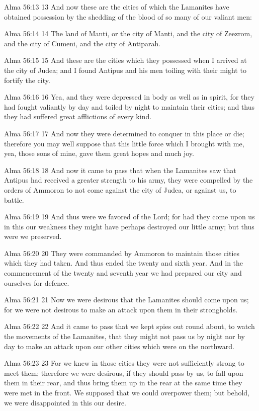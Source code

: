 Alma 56:13
 13 And now these are the cities of which the Lamanites have
obtained possession by the shedding of the blood of so many of
our valiant men:

Alma 56:14
 14 The land of Manti, or the city of Manti, and the city of
Zeezrom, and the city of Cumeni, and the city of Antiparah.

Alma 56:15
 15 And these are the cities which they possessed when I arrived
at the city of Judea; and I found Antipus and his men toiling
with their might to fortify the city.

Alma 56:16
 16 Yea, and they were depressed in body as well as in spirit,
for they had fought valiantly by day and toiled by night to
maintain their cities; and thus they had suffered great
afflictions of every kind.

Alma 56:17
 17 And now they were determined to conquer in this place or die;
therefore you may well suppose that this little force which I
brought with me, yea, those sons of mine, gave them great hopes
and much joy.

Alma 56:18
 18 And now it came to pass that when the Lamanites saw that
Antipus had received a greater strength to his army, they were
compelled by the orders of Ammoron to not come against the city
of Judea, or against us, to battle.

Alma 56:19
 19 And thus were we favored of the Lord; for had they come upon
us in this our weakness they might have perhaps destroyed our
little army; but thus were we preserved.

Alma 56:20
 20 They were commanded by Ammoron to maintain those cities which
they had taken. And thus ended the twenty and sixth year. And
in the commencement of the twenty and seventh year we had
prepared our city and ourselves for defence.

Alma 56:21
 21 Now we were desirous that the Lamanites should come upon us;
for we were not desirous to make an attack upon them in their
strongholds.

Alma 56:22
 22 And it came to pass that we kept spies out round about, to
watch the movements of the Lamanites, that they might not pass us
by night nor by day to make an attack upon our other cities which
were on the northward.

Alma 56:23
 23 For we knew in those cities they were not sufficiently strong
to meet them; therefore we were desirous, if they should pass by
us, to fall upon them in their rear, and thus bring them up in
the rear at the same time they were met in the front. We
supposed that we could overpower them; but behold, we were
disappointed in this our desire.

